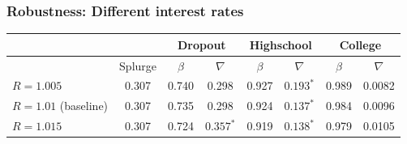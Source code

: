 \documentclass[pdflatex,aspectratio=169]{beamer}
\begin{document}
\begin{frame}
	\frametitle{Robustness: Different interest rates}
	\begin{tabular}{lc|cccccc} 
		\toprule
		& & \multicolumn{2}{c}{Dropout} & \multicolumn{2}{c}{Highschool} & \multicolumn{2}{c}{College} \\ \midrule 
		& Splurge & $\beta$ & $\nabla$ & $\beta$ & $\nabla$ & $\beta$ & $\nabla$ \\ \midrule 
		$R = 1.005$ & 0.307 & 0.740 & 0.298 & 0.927 & $0.193^{*}$ & 0.989 & 0.0082 \\
		$R = 1.01$ (baseline) & 0.307 & 0.735 & 0.298 & 0.924 & $0.137^{*}$ & 0.984 & 0.0096 \\ 
		$R = 1.015$ & 0.307 & 0.724 & $0.357^{*}$ & 0.919 & $0.138^{*}$ & 0.979 & 0.0105 
		\\ \bottomrule 
	\end{tabular}
\end{frame}
\end{document}
